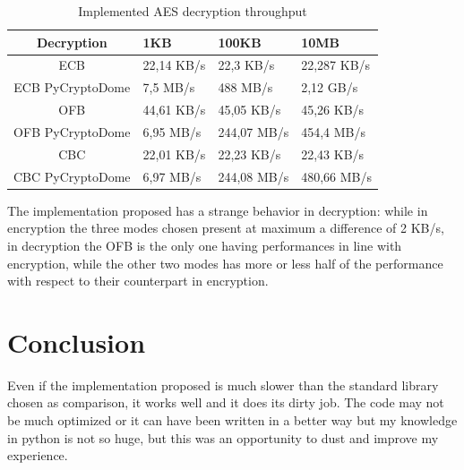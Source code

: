 \documentclass{article}
\begin{document}
\begin{table}[h]
\begin{center}
\begin{tabular}{ | c || m{2cm} | m{2cm} | m{2cm}|  }
\hline
  Decryption & 1KB & 100KB & 10MB \\ [0.5ex] 
 \hline\hline
   ECB & 22,14 KB/s & 22,3 KB/s & 22,287 KB/s \\ 
 \hline
  ECB PyCryptoDome & 7,5 MB/s & 488 MB/s & 2,12 GB/s \\ 
 \hline
 OFB & 44,61 KB/s & 45,05 KB/s &  45,26 KB/s \\
 \hline
  OFB PyCryptoDome & 6,95 MB/s & 244,07 MB/s &  454,4 MB/s \\
 \hline
 CBC & 22,01 KB/s & 22,23 KB/s &  22,43 KB/s \\ 
 \hline
  CBC PyCryptoDome & 6,97 MB/s & 244,08 MB/s &  480,66 MB/s \\
 \hline
\end{tabular}
\caption{Implemented AES decryption throughput}
\label{tab:dec}
\end{center}
\end{table}

The implementation proposed has a strange behavior in decryption: while in encryption the three modes chosen present at maximum a difference of 2 KB/s, in decryption the OFB is the only one having performances in line with encryption, while the other two modes has more or less half of the performance with respect to their counterpart in encryption.


\section{Conclusion}

Even if the implementation proposed is much slower than the standard library chosen as comparison, it works well and it does its dirty job. The code may not be much optimized or it can have been written in a better way but my knowledge in python is not so huge, but this was an opportunity to dust and improve my experience.







\end{document}

